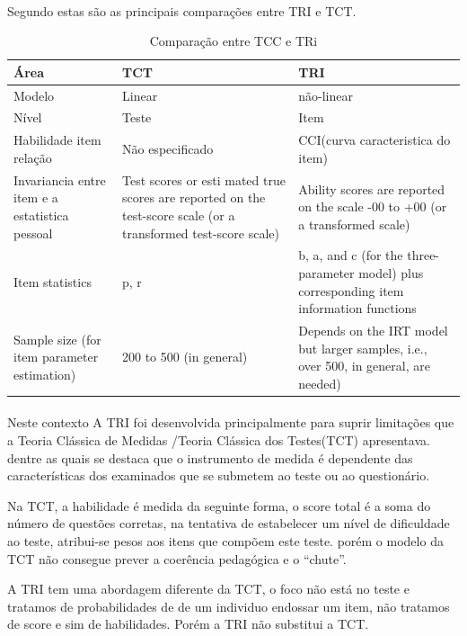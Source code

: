 	\paragraph{}
	    Segundo \cite{Ronald} estas são as principais comparações entre TRI e TCT.
	\begin{table}[!h]
	    \centering
	    \caption{Comparação entre TCC e TRi}
	    \begin{tabular}{|p{4cm}|p{4cm}|p{4cm}|}
	        \hline
	         Área & TCT & TRI \\
	         \hline
	         \hline
	         Modelo & Linear & não-linear\\
	         \hline
	         Nível & Teste & Item \\
	         \hline
	         Habilidade item relação & Não especificado & CCI(curva caracteristica do item)\\
	         \hline
	         Invariancia entre item e a estatistica pessoal & Test scores or esti mated true scores are reported on the test-score scale (or a transformed test-score scale) & Ability scores are reported on the scale -00 to +00 (or a transformed scale)\\
	         \hline
	         Item statistics & p, r & b, a, and c (for the three-parameter model) plus corresponding item information functions \\
	         \hline
	         Sample size (for item parameter estimation) & 200 to 500 (in general) & Depends on the IRT model but larger samples, i.e., over 500, in general, are needed)\\
	         \hline
	    \end{tabular}
	     \label{tab:comparacao}
	\end{table}
	  
	\paragraph{}
	    Neste contexto A TRI foi desenvolvida principalmente para suprir limitações que a Teoria Clássica de Medidas /Teoria Clássica dos Testes(TCT) apresentava. dentre as quais se destaca que o instrumento de medida é dependente das características dos examinados que se submetem ao teste ou ao questionário.
	\par
	    Na TCT, a habilidade é medida da seguinte forma, o score total é a soma do número de questões corretas, na tentativa de estabelecer um nível de dificuldade ao teste, atribui-se pesos aos itens que compõem este teste. porém o modelo da TCT não consegue prever a coerência pedagógica e o “chute”.
	\par
	    A TRI tem uma abordagem diferente da TCT, o foco não está no teste e tratamos de probabilidades de de um individuo endossar um item, não tratamos de score e sim de habilidades. Porém a TRI não substitui a TCT.
		
